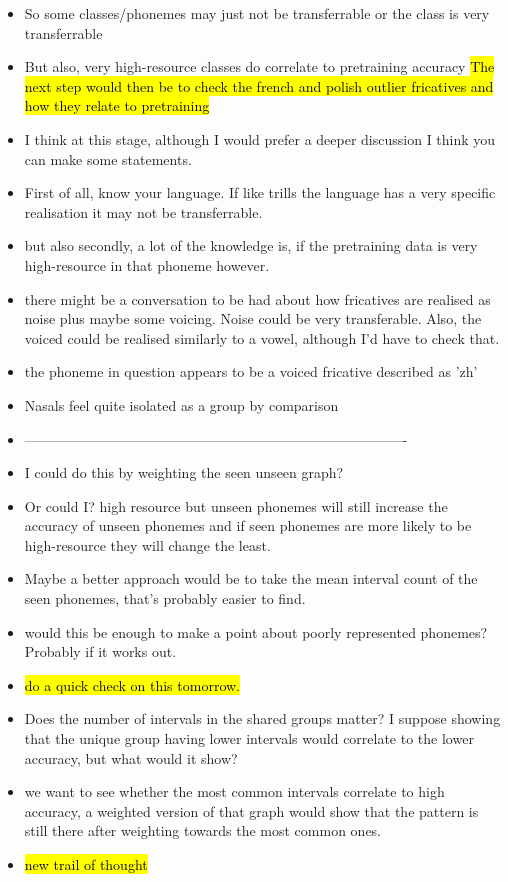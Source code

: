 \begin{itemize}
    \item So some classes/phonemes may just not be transferrable or the class is very transferrable
    \item But also, very high-resource classes do correlate to pretraining accuracy
    \hl{The next step would then be to check the french and polish outlier fricatives and how they relate to pretraining}
    \item I think at this stage, although I would prefer a deeper discussion I think you can make some statements.
    \item First of all, know your language. If like trills the language has a very specific realisation it may not be transferrable.
    \item but also secondly, a lot of the knowledge is, if the pretraining data is very high-resource in that phoneme however.
    \item there might be a conversation to be had about how fricatives are realised as noise plus maybe some voicing. Noise could be very transferable. Also, the voiced could be realised similarly to a vowel, although I'd have to check that.
    \item the phoneme in question appears to be  a voiced fricative described as 'zh' %
    \item Nasals feel quite isolated as a group by comparison


    \item ----------------------------------------------------------------------------------
    \item I could do this by weighting the seen unseen graph?
    \item Or could I? high resource but unseen phonemes will still increase the accuracy of unseen phonemes and if seen phonemes are more likely to be high-resource they will change the least.
    \item Maybe a better approach would be to take the mean interval count of the seen phonemes, that's probably easier to find.
    \item would this be enough to make a point about poorly represented phonemes? Probably if it works out.
    \item \hl{do a quick check on this tomorrow.}
    \item Does the number of intervals in the shared groups matter? I suppose showing that the unique group having lower intervals would correlate to the lower accuracy, but what would it show?
    \item we want to see whether the most common intervals correlate to high accuracy, a weighted version of that graph would show that the pattern is still there after weighting towards the most common ones.
    \item \hl{new trail of thought}
    
\end{itemize}

